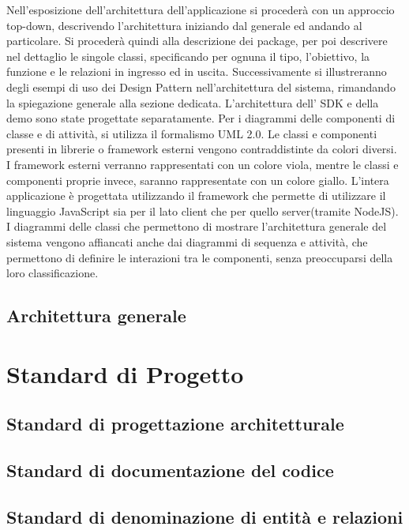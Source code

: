 Nell’esposizione dell’architettura dell’applicazione si procederà con un approccio top-down, descrivendo l’architettura iniziando dal generale ed andando al particolare.
Si procederà quindi alla descrizione dei package, per poi descrivere
nel dettaglio le singole classi, specificando per ognuna il tipo, l’obiettivo, la funzione e
le relazioni in ingresso ed in uscita.
Successivamente si illustreranno degli esempi di uso dei Design Pattern nell’architettura del sistema, rimandando la spiegazione generale alla sezione dedicata.
L'architettura dell' SDK e della demo sono state progettate separatamente.  
Per i diagrammi delle componenti di classe e di attività, si utilizza il formalismo UML 2.0. Le classi e componenti presenti in librerie o framework esterni vengono contraddistinte da colori diversi. I framework esterni verranno rappresentati con un colore viola, mentre le classi e componenti proprie invece, saranno rappresentate con un colore giallo.
L'intera applicazione è progettata utilizzando il framework  che permette di utilizzare il linguaggio JavaScript sia per il lato client che per quello server(tramite NodeJS).
I diagrammi delle classi che permettono di mostrare l’architettura generale del sistema vengono affiancati anche dai diagrammi di sequenza e attività, che permettono di definire le interazioni tra le componenti, senza preoccuparsi della loro classificazione.
 
\subsection{Architettura generale}



\section{Standard di Progetto}

\subsection{Standard di progettazione architetturale}


\subsection{Standard di documentazione del codice}

\subsection{Standard di denominazione di entità e relazioni }

